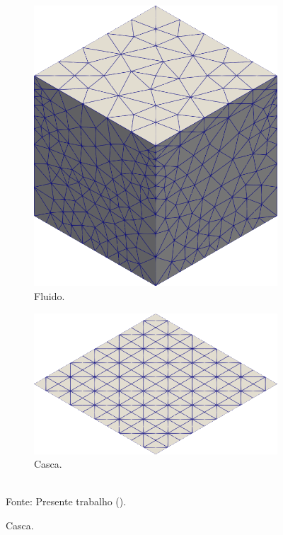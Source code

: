 \begin{figure}[h!]
    \centering
    \caption{Cavidade tridimensional - Malhas utilizadas para o segundo caso.}
    \begin{subfigure}[b]{0.4\textwidth}
        \includegraphics[width=\linewidth]{Figuras/FSI-Cavity3D/fm2.png}
        \caption{Fluido.}
    \end{subfigure}
    \begin{subfigure}[b]{0.4\textwidth}
        \includegraphics[width=\linewidth]{Figuras/FSI-Cavity3D/sm2.png}
        \caption{Casca.}
    \end{subfigure}
    \\Fonte: Presente trabalho (\the\year).
    \label{fig:Cavity3D-coarse}
\end{figure}

